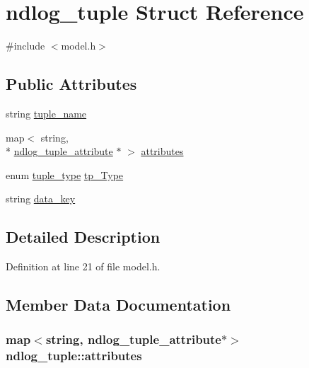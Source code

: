 \hypertarget{structndlog__tuple}{\section{ndlog\-\_\-tuple Struct Reference}
\label{structndlog__tuple}
}


{\ttfamily \#include $<$model.\-h$>$}

\subsection*{Public Attributes}
\begin{DoxyCompactItemize}
\item 
string \hyperlink{structndlog__tuple_a60630913345afa409a56b2e612c9afea}{tuple\-\_\-name}
\item 
map$<$ string, \\*
\hyperlink{structndlog__tuple__attribute}{ndlog\-\_\-tuple\-\_\-attribute} $\ast$ $>$ \hyperlink{structndlog__tuple_a2dc7a9bff142acf9b032b2c38fdd4e4c}{attributes}
\item 
enum \hyperlink{model_8h_ae688e205096dad09ca010b144f151f40}{tuple\-\_\-type} \hyperlink{structndlog__tuple_aa81437991ac9a764841242a8f82b1257}{tp\-\_\-\-Type}
\item 
string \hyperlink{structndlog__tuple_acd5e93ff19d18ae9eb60a29e2f66937c}{data\-\_\-key}
\end{DoxyCompactItemize}


\subsection{Detailed Description}


Definition at line 21 of file model.\-h.



\subsection{Member Data Documentation}
\hypertarget{structndlog__tuple_a2dc7a9bff142acf9b032b2c38fdd4e4c}{
\subsubsection[{attributes}]{\setlength{\rightskip}{0pt plus 5cm}map$<$string, {\bf ndlog\-\_\-tuple\-\_\-attribute}$\ast$$>$ ndlog\-\_\-tuple\-::attributes}}\label{structndlog__tuple_a2dc7a9bff142acf9b032b2c38fdd4e4c}


